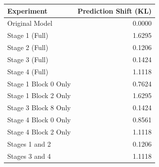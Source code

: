 \begin{tabular}{lr}
\toprule
Experiment & Prediction Shift (KL) \\
\midrule
Original Model & 0.0000 \\
Stage 1 (Full) & 1.6295 \\
Stage 2 (Full) & 0.1206 \\
Stage 3 (Full) & 0.1424 \\
Stage 4 (Full) & 1.1118 \\
Stage 1 Block 0 Only & 0.7624 \\
Stage 1 Block 2 Only & 1.6295 \\
Stage 3 Block 8 Only & 0.1424 \\
Stage 4 Block 0 Only & 0.8561 \\
Stage 4 Block 2 Only & 1.1118 \\
Stages 1 and 2 & 0.1206 \\
Stages 3 and 4 & 1.1118 \\
\bottomrule
\end{tabular}
